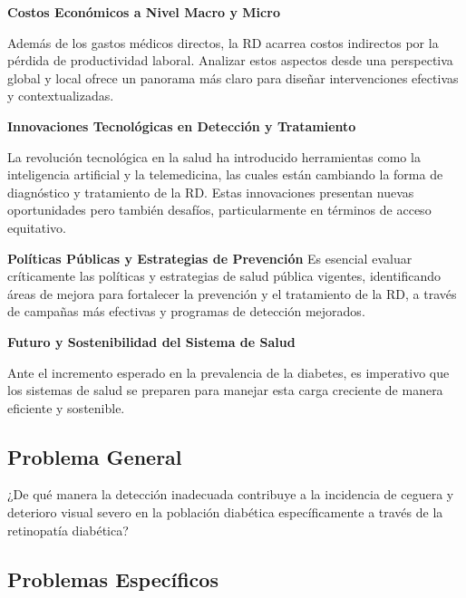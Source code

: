 \textbf{ Costos Económicos a Nivel Macro y Micro}

Además de los gastos médicos directos, la RD acarrea costos indirectos por la pérdida de productividad laboral. Analizar estos aspectos desde una perspectiva global y local ofrece un panorama más claro para diseñar intervenciones efectivas y contextualizadas.

\textbf {Innovaciones Tecnológicas en Detección y Tratamiento}

La revolución tecnológica en la salud ha introducido herramientas como la inteligencia artificial y la telemedicina, las cuales están cambiando la forma de diagnóstico y tratamiento de la RD. Estas innovaciones presentan nuevas oportunidades pero también desafíos, particularmente en términos de acceso equitativo.

\textbf {Políticas Públicas y Estrategias de Prevención}
Es esencial evaluar críticamente las políticas y estrategias de salud pública vigentes, identificando áreas de mejora para fortalecer la prevención y el tratamiento de la RD, a través de campañas más efectivas y programas de detección mejorados.

\textbf {Futuro y Sostenibilidad del Sistema de Salud}

Ante el incremento esperado en la prevalencia de la diabetes, es imperativo que los sistemas de salud se preparen para manejar esta carga creciente de manera eficiente y sostenible.

\subsection{Problema General}
\newcommand{\ProblemaGeneral}{
	¿De qué manera la detección inadecuada contribuye a la incidencia de ceguera y deterioro visual severo en la población diabética específicamente a través de la retinopatía diabética?
}
\ProblemaGeneral
\subsection{Problemas Espec\'{i}ficos}
\newcommand{\Pbone}{
	¿Hasta qué punto la precisión de los modelos de deep learning en la detección temprana de la retinopatía diabética afecta la tasa de diagnósticos correctos y oportunos en comparación con los métodos convencionales de cribado?
}
\newcommand{\Pbtwo}{
	¿De qué forma la calidad y disponibilidad de los datos de entrenamiento impactan la capacidad de los modelos de deep learning para predecir de manera efectiva la retinopatía diabética, y cuál es su influencia en la prevención de la ceguera en pacientes diabéticos?
}
\newcommand{\Pbthree}{
	¿Cómo incide la variabilidad intra e inter observador en la anotación de datos en la precisión de los modelos de deep learning para detectar la retinopatía diabética en diversas poblaciones?
}
\newcommand{\Pbfour}{
	W
}
\newcommand{\Pbfive}{
	ES
}

